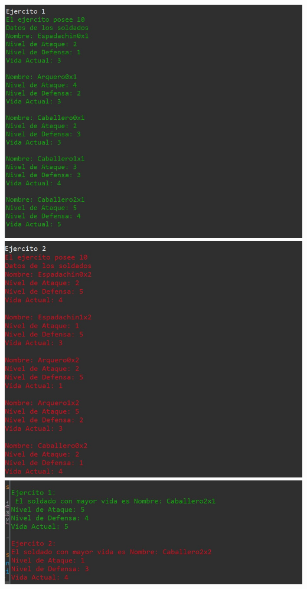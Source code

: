 \documentclass{article}
\begin{document}
	\includegraphics[scale=0.5]{img/captura2.jpeg} 
	\includegraphics[scale=0.5]{img/captura3.jpeg} 
	\includegraphics[scale=0.5]{img/captura4.jpeg} 
\end{document}
